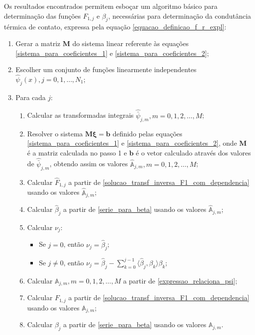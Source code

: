 Os resultados encontrados permitem esboçar um algoritmo básico para determinação das funções $F_{1,j}$ e $\beta_j$, necessárias para determinação da condutância térmica de contato, expressa pela equação \eqref{equacao_definicao_f_r_expl}:
\begin{enumerate}
	\item Gerar a matriz $\mathbf{M}$ do sistema linear referente às equações \eqref{sistema_para_coeficientes_1} e \eqref{sistema_para_coeficientes_2};
	\item Escolher um conjunto de funções linearmente independentes $\hat{\psi}_j(x), j=0,1,\ldots,N_1$;
	\item Para cada $j$:
		\begin{enumerate}	
			\item Calcular as transformadas integrais $\hat{\bar{\psi}}_{j,m}, m=0,1,2, \ldots, M$;
			\item Resolver o sistema $\mathbf{M}\mathbf{\xi} = \mathbf{b}$ definido pelas equações \eqref{sistema_para_coeficientes_1} e \eqref{sistema_para_coeficientes_2}, onde $\mathbf{M}$ é a matriz calculada no passo 1 e $\mathbf{b}$ é o vetor calculado através dos valores de $\hat{\bar{\psi}}_{j,m}$, obtendo assim os valores $\hat{\mathbb{A}}_{j,m}, m=0,1,2, \ldots, M$;
			\item Calcular $\hat{F}_{1,j}$ a partir de \eqref{solucao_transf_inversa_F1_com_dependencia} usando os valores $\hat{\mathbb{A}}_{j,m}$;
			\item Calcular $\hat{\beta}_j$ a partir de \eqref{serie_para_beta} usando os valores $\hat{\mathbb{A}}_{j,m}$;
			\item Calcular $\nu_j$:
				\begin{itemize}
				\item Se $j = 0$, então $\nu_j = \hat{\beta}_j$;
				\item Se $j \ne 0$, então $\nu_j = \hat{\beta}_j - \displaystyle\sum_{k = 0}^{j - 1} \langle \hat{\beta}_j, \beta_k\rangle\beta_k$;
				\end{itemize}
			\item Calcular $\mathbb{A}_{j,m}, m=0,1,2, \ldots, M$ a partir de \eqref{expressao_relaciona_psi};
			\item Calcular $F_{1,j}$ a partir de \eqref{solucao_transf_inversa_F1_com_dependencia} usando os valores $\mathbb{A}_{j,m}$;
			\item Calcular $\beta_j$ a partir de \eqref{serie_para_beta} usando os valores $\mathbb{A}_{j,m}$.
	\end{enumerate}
\end{enumerate}

